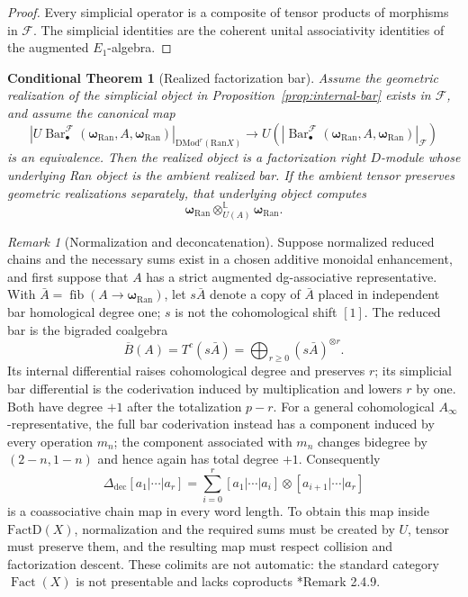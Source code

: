 \documentclass[11pt,reqno]{amsart}
\newtheorem{conditionaltheorem}[theorem]{Conditional Theorem}
\theoremstyle{definition}
\theoremstyle{remark}
\newtheorem{remark}[theorem]{Remark}
\providecommand{\Ran}{\mathrm{Ran}}
\providecommand{\FactD}{\mathrm{FactD}}
\providecommand{\DMod}{\mathrm{DMod}}
\newcommand{\Barc}{\operatorname{Bar}}
\begin{document}
\begin{proof}
Every simplicial operator is a composite of tensor products of
morphisms in \(\mathcal F\).  The simplicial identities are the coherent
unital associativity identities of the augmented \(E_1\)-algebra.
\end{proof}

\begin{conditionaltheorem}[Realized factorization bar]
\label{thm:realized-bar}
Assume the geometric realization of the simplicial object in
Proposition~\ref{prop:internal-bar} exists in \(\mathcal F\), and assume
the canonical map
\[
 \left|U\Barc^{\mathcal F}_\bullet
   (\boldsymbol\omega_{\Ran},A,\boldsymbol\omega_{\Ran})
 \right|_{\DMod^r(\Ran X)}
 \longrightarrow
 U\!\left(
 \left|\Barc^{\mathcal F}_\bullet
   (\boldsymbol\omega_{\Ran},A,\boldsymbol\omega_{\Ran})
 \right|_{\mathcal F}\right)
\]
is an equivalence.  Then the realized object is a factorization right
\(D\)-module whose underlying Ran object is the ambient realized bar.
If the ambient tensor preserves geometric realizations separately, that
underlying object computes
\[
 \boldsymbol\omega_{\Ran}
 \otimes^{\mathbb L}_{U(A)}
 \boldsymbol\omega_{\Ran}.
\]
\end{conditionaltheorem}

\begin{remark}[Normalization and deconcatenation]
\label{rem:deconcatenation}
Suppose normalized reduced chains and the necessary sums exist in a
chosen additive monoidal enhancement, and first suppose that \(A\) has
a strict augmented dg-associative representative.  With
\(\bar A=\operatorname{fib}(A\to\boldsymbol\omega_{\Ran})\), let
\(s\bar A\) denote a copy of \(\bar A\) placed in independent bar
homological degree one; \(s\) is not the cohomological shift \([1]\).
The reduced bar is the bigraded coalgebra
\[
 \overline B(A)=T^c(s\bar A)
 =\bigoplus_{r\ge0}(s\bar A)^{\otimes r}.
\]
Its internal differential raises cohomological degree and preserves
\(r\); its simplicial bar differential is the coderivation induced by
multiplication and lowers \(r\) by one.  Both have degree \(+1\) after
the totalization \(p-r\).
For a general cohomological \(A_\infty\)-representative, the full bar
coderivation instead has a component induced by every operation \(m_n\);
the component associated with \(m_n\) changes bidegree by
\((2-n,1-n)\) and hence again has total degree \(+1\).
Consequently
\[
 \Delta_{\mathrm{dec}}[a_1|\cdots|a_r]
 =\sum_{i=0}^r
 [a_1|\cdots|a_i]\otimes[a_{i+1}|\cdots|a_r]
\]
is a coassociative chain map in every word length.  To obtain this map
inside \(\FactD(X)\), normalization and the required sums must be
created by \(U\), tensor must preserve them, and the resulting map must
respect collision and factorization descent.  These colimits are not
automatic: the standard category \(\operatorname{Fact}(X)\) is not
presentable and lacks coproducts
\cite{FG12}*{Remark 2.4.9}.
\end{remark}
\end{document}
